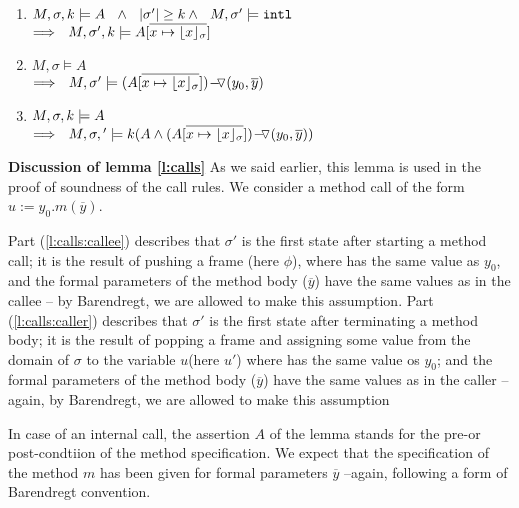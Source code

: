\begin{lemma}
\begin{enumerate}
\begin{enumerate}
\item
\label{l:calls:caller:one}
$\satDAssertFrom M  \sigma k   A \ \ \wedge\ \ \DepthSt {\sigma'} \geq k  \wedge\ \ M, \sigma' \models \intThis $ \\
$\Longrightarrow\ \  \satDAssertFrom M  {\sigma'} k   {A[\overline {x \mapsto {\interpret \sigma x}}]}$ 

\item
\label{l:calls:caller:two}
$  M , \sigma \models   A$   \\
$\Longrightarrow\ \  M , \sigma' \models  {\PushASLong  {(y_0,\overline y)}   {(A[\overline {x \mapsto {\interpret \sigma x}}])}}$

\item
\label{l:calls:caller:three}
$\satDAssertFrom M  \sigma k   A $   \\
$\Longrightarrow\ \  \satDAssertFrom M  \sigma' k    {(A \wedge \PushASLong  {(y_0,\overline y)}   {(A[\overline {x \mapsto {\interpret \sigma x}}])})}$

 \end{enumerate}
\end{enumerate}

\end{lemma}

\textbf{Discussion of lemma  \ref{l:calls}}
As we said earlier, this lemma is used in the proof of soundness of the call rules. 
We consider a method call of the form $u:= y_0.m(\overline y)$.

Part (\ref{l:calls:callee}) describes that $\sigma'$ is the first state after starting a method call; it is
the result of pushing a frame (here $\phi$), where  has the same value as $y_0$, 
and the formal parameters of the method body ($\overline y$) have the same values as in the callee -- by Barendregt, we are allowed to make this assumption. 
Part (\ref{l:calls:caller}) describes that $\sigma'$ is the first state after terminating a method body; it is
the result of popping a frame  and assigning  some value from the domain of $\sigma$ to the variable $u$(here $u'$) where  has the same value os $y_0$; 
and the formal parameters of the method body ($\overline y$) have the same values as in the caller
-- again,  by Barendregt, we are allowed to make this assumption 

In case of an internal call, the assertion $A$ of the lemma stands for the pre-or post-condtiion
of the method specification.
We  expect that the specification of the method $m$ has been
given for formal parameters $\overline y$ --again, following a form of Barendregt convention.

